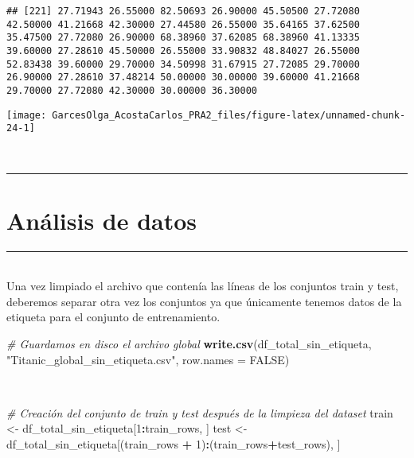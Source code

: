 \documentclass[
]{article}
\newenvironment{Shaded}{\begin{snugshade}}{\end{snugshade}}
\newcommand{\CommentTok}[1]{\textcolor[rgb]{0.56,0.35,0.01}{\textit{#1}}}
\newcommand{\DataTypeTok}[1]{\textcolor[rgb]{0.13,0.29,0.53}{#1}}
\newcommand{\DecValTok}[1]{\textcolor[rgb]{0.00,0.00,0.81}{#1}}
\newcommand{\KeywordTok}[1]{\textcolor[rgb]{0.13,0.29,0.53}{\textbf{#1}}}
\newcommand{\NormalTok}[1]{#1}
\newcommand{\OperatorTok}[1]{\textcolor[rgb]{0.81,0.36,0.00}{\textbf{#1}}}
\newcommand{\OtherTok}[1]{\textcolor[rgb]{0.56,0.35,0.01}{#1}}
\newcommand{\StringTok}[1]{\textcolor[rgb]{0.31,0.60,0.02}{#1}}
\begin{document}
\begin{verbatim}
## [221] 27.71943 26.55000 82.50693 26.90000 45.50500 27.72080 42.50000 41.21668 42.30000 27.44580 26.55000 35.64165 37.62500 35.47500 27.72080 26.90000 68.38960 37.62085 68.38960 41.13335 39.60000 27.28610 45.50000 26.55000 33.90832 48.84027 26.55000 52.83438 39.60000 29.70000 34.50998 31.67915 27.72085 29.70000 26.90000 27.28610 37.48214 50.00000 30.00000 39.60000 41.21668 29.70000 27.72080 42.30000 30.00000 36.30000
\end{verbatim}

\begin{center}\texttt{[image: GarcesOlga\_AcostaCarlos\_PRA2\_files/figure-latex/unnamed-chunk-24-1]} \end{center}

\texttt{}~\\
\texttt{}

\begin{center}\rule{0.5\linewidth}{0.5pt}\end{center}

\hypertarget{anuxe1lisis-de-datos}{%
\section{\texorpdfstring{\textbf{Análisis de
datos}}{Análisis de datos}}\label{anuxe1lisis-de-datos}}

\begin{center}\rule{0.5\linewidth}{0.5pt}\end{center}

\texttt{}\\
Una vez limpiado el archivo que contenía las líneas de los conjuntos
train y test, deberemos separar otra vez los conjuntos ya que únicamente
tenemos datos de la etiqueta para el conjunto de entrenamiento.

\texttt{}

\begin{Shaded}
\begin{Highlighting}[]
\CommentTok{# Guardamos en disco el archivo global}
\KeywordTok{write.csv}\NormalTok{(df_total_sin_etiqueta, }\StringTok{"Titanic_global_sin_etiqueta.csv"}\NormalTok{, }\DataTypeTok{row.names =} \OtherTok{FALSE}\NormalTok{)}
\end{Highlighting}
\end{Shaded}

\texttt{}\\
\texttt{}

\begin{Shaded}
\begin{Highlighting}[]
\CommentTok{# Creación del conjunto de train y test después de la limpieza del dataset}
\NormalTok{train <-}\StringTok{ }\NormalTok{df_total_sin_etiqueta[}\DecValTok{1}\OperatorTok{:}\NormalTok{train_rows, ]}
\NormalTok{test <-}\StringTok{ }\NormalTok{df_total_sin_etiqueta[(train_rows }\OperatorTok{+}\StringTok{ }\DecValTok{1}\NormalTok{)}\OperatorTok{:}\NormalTok{(train_rows}\OperatorTok{+}\NormalTok{test_rows), ]}
\end{Highlighting}
\end{Shaded}
\end{document}
